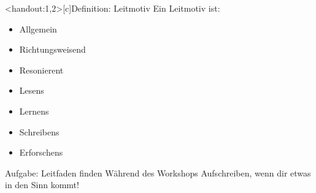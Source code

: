 \addtocounter{framenumber}{-1}
\begin{frame}<handout:1,2>[c]{Definition: Leitmotiv}
    \vspace{0.5cm}
    \large{
    Ein Leitmotiv ist:}
    \begin{itemize}[<+(1)->]
        \large
        \item Allgemein
        \item Richtungsweisend
        \item Resonierent
    \end{itemize}
    \pause
    \vspace{0.4cm}
    { 
      \addtocounter{framenumber}{1}
    }
    \begin{multicols}{2}
    \begin{itemize}[<+(1)->]
        \item Lesens
        \item Lernens
        \item Schreibens
        \item Erforschens
    \end{itemize}
    \end{multicols}
\end{frame}



\begin{frame}[c]
    \large
    \begin{block}{Aufgabe: Leitfaden finden}
    Während des Workshops Aufschreiben, wenn dir etwas in den Sinn kommt!
    \end{block}
\end{frame}


%



